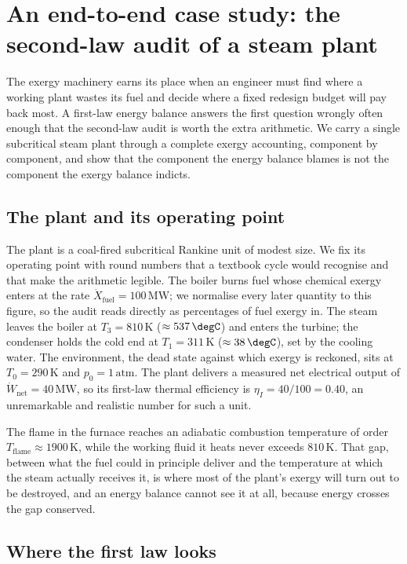 \section{An end-to-end case study: the second-law audit of a steam plant}

The exergy machinery earns its place when an engineer must find where a
working plant wastes its fuel and decide where a fixed redesign budget
will pay back most. A first-law energy balance answers the first
question wrongly often enough that the second-law audit is worth the
extra arithmetic. We carry a single subcritical steam plant through a
complete exergy accounting, component by component, and show that the
component the energy balance blames is not the component the exergy
balance indicts.

\subsection{The plant and its operating point}

The plant is a coal-fired subcritical Rankine unit of modest size. We
fix its operating point with round numbers that a textbook cycle would
recognise and that make the arithmetic legible. The boiler burns fuel
whose chemical exergy enters at the rate $\dot X_{\text{fuel}} =
100\,\text{MW}$; we normalise every later quantity to this figure, so
the audit reads directly as percentages of fuel exergy in. The steam
leaves the boiler at $T_3 = 810\,\si{\kelvin}$ ($\approx 537\,\degC$)
and enters the turbine; the condenser holds the cold end at $T_1 =
311\,\si{\kelvin}$ ($\approx 38\,\degC$), set by the cooling water. The
environment, the dead state against which exergy is reckoned, sits at
$T_0 = 290\,\si{\kelvin}$ and $p_0 = 1\,\text{atm}$. The plant delivers
a measured net electrical output of $\dot W_{\text{net}} = 40\,\text{MW}$,
so its first-law thermal efficiency is $\eta_I = 40/100 = 0.40$, an
unremarkable and realistic number for such a unit.

The flame in the furnace reaches an adiabatic combustion temperature of
order $T_{\text{flame}} \approx 1900\,\si{\kelvin}$, while the working
fluid it heats never exceeds $810\,\si{\kelvin}$. That gap, between what
the fuel could in principle deliver and the temperature at which the
steam actually receives it, is where most of the plant's exergy will
turn out to be destroyed, and an energy balance cannot see it at all,
because energy crosses the gap conserved.

\subsection{Where the first law looks}

